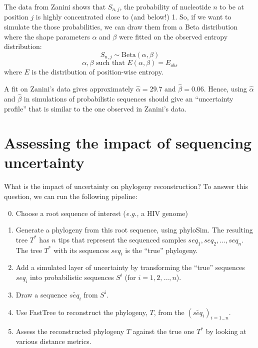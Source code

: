 \documentclass[12pt]{article}
\newcommand{\betadist}[1]{\mathrm{Beta}\left(#1\right)}
\newcommand{\eg}{\textit{e.g.,}\xspace}
\begin{document}
The data from Zanini shows that $S_{n,j}$, the probability of nucleotide $n$ to be at position $j$ is highly concentrated close to (and below!) 1. 
So, if we want to simulate the those probabilities, we can draw them from a Beta distribution where the shape parameters $\alpha$ and $\beta$ were fitted on the observed entropy distribution:
\begin{equation}
S_{n,j} \sim \betadist{\alpha, \beta}
\end{equation}
\begin{equation}
\alpha, \beta \text{ such that } E(\alpha,\beta) = E_{obs}
\end{equation}
where $E$ is the distribution of position-wise entropy.

A fit on Zanini's data gives approximately $\hat{\alpha} = 29.7$ and $\hat{\beta} = 0.06$. Hence, using $\hat{\alpha}$ and $\hat{\beta}$ in simulations of probabilistic sequences should give an ``uncertainty profile'' that is similar to the one observed in Zanini's data. 



\section{Assessing the impact of sequencing uncertainty}


What is the impact of uncertainty on phylogeny reconstruction? 
To answer this question, we can run the following pipeline:

\begin{enumerate}
\setcounter{enumi}{-1} 
\item Choose a root sequence of interest (\eg a HIV genome)
\item Generate a phylogeny from this root sequence, using \textsf{phyloSim}. The resulting tree $T^*$ has $n$ tips that represent the sequenced samples $seq_1, seq_2,\ldots, seq_n$. The tree $T^*$ with its sequences $seq_i$ is the ``true'' phylogeny.
\item Add a simulated layer of uncertainty by transforming the ``true'' sequences $seq_i$ into probabilistic sequences $S^i$ (for $i=1,2,\ldots,n$).
\item Draw a sequence $\widetilde{seq_i}$ from $S^i$.
\item Use \textsf{FastTree} to reconstruct the phylogeny, $T$, from the $(\widetilde{seq_i})_{i=1\ldots n}$. 
\item Assess the reconstructed phylogeny $T$ against the true one $T^*$ by looking at various distance metrics.
\end{enumerate}
\end{document}

